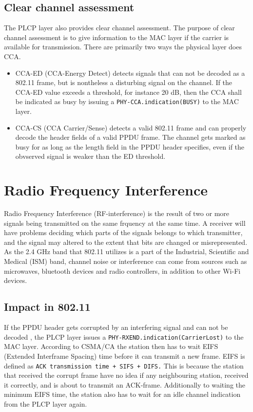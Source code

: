 	\subsection{Clear channel assessment}
	The PLCP layer also provides clear channel assessment.
	The purpose of clear channel assessment is to give information to the MAC
	layer if the carrier is available for transmission. There
	are primarily two ways the physical layer does CCA.
	\begin{itemize}
	\item CCA-ED (CCA-Energy Detect) detects signals that can not be decoded as a 802.11 frame, but is nontheless a disturbing signal on the channel. If the CCA-ED value
	exceeds a threshold, for instance 20 dB, then the CCA shall be indicated as
	busy by issuing a \verb|PHY-CCA.indication(BUSY)| to the MAC layer.  
	\item CCA-CS (CCA Carrier/Sense) detects a valid 802.11 frame and can
	properly decode the header fields of a valid PPDU frame.
	The channel gets marked as busy for as long as the length
	field in the PPDU header specifies, even if the obvserved
	signal is weaker than the ED threshold. 
	\end{itemize}

	\section{Radio Frequency Interference}
	Radio Frequency Interference (RF-interference) is the result
	of two or more signals being transmitted on the same frquency at the same time.
	A receiver will have problems deciding which parts of the signals 
	belongs to which transmitter, and the signal may altered to the extent
	that bits are changed or misrepresented. As the 2.4 GHz band that 802.11
	utilizes is a part of the Industrial, Scientific and Medical (ISM) band, channel noise or interference
	can come from sources such as microwaves, bluetooth devices and radio controllers, in addition to other Wi-Fi devices. 

	\subsection{Impact in 802.11}
	If the PPDU header
	gets corrupted by an interfering signal and can not be decoded
	, the PLCP layer issues a \verb|PHY-RXEND.indication(CarrierLost)|
	to the MAC layer. According to CSMA/CA the station then has to
	wait EIFS (Extended Interframe Spacing) time before
	it can transmit a new frame. EIFS is defined as
	\verb|ACK transmission time + SIFS + DIFS.| This is because the station that received the corrupt frame have no idea if any neighbouring station,
	received it correctly, and is about to transmit an ACK-frame. Additionally
	to waiting the minimum EIFS time, the station also has to wait for
	an idle channel indication from the PLCP layer again.
	
